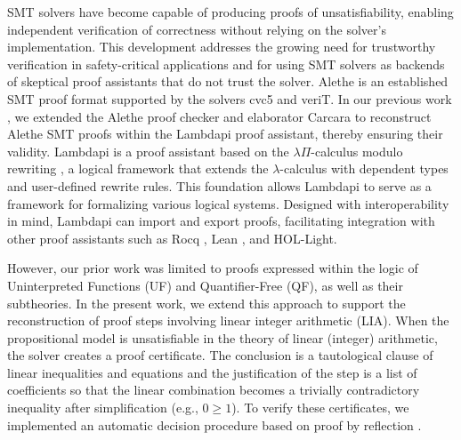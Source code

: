 \documentclass[runningheads]{llncs}
\begin{document}
SMT solvers have become capable of producing proofs of unsatisfiability,  enabling independent verification of correctness without relying on the solver's implementation.
This development addresses the growing need for trustworthy verification in safety-critical applications and for using SMT solvers as backends of skeptical proof assistants that do not trust the solver.
Alethe \cite{alethe,alethespec} is an established SMT proof format supported by the solvers cvc5 and veriT. In our previous work \cite{ColtellacciMD24}, we extended the Alethe proof checker and elaborator Carcara \cite{carcara} to
reconstruct Alethe SMT proofs within the Lambdapi proof assistant, thereby ensuring their validity.
Lambdapi \cite{lambdapi} is a proof assistant based on the $\lambda\Pi$-calculus modulo rewriting \cite{lpmodulo}, a logical framework \cite{lf} that extends the $\lambda$-calculus with dependent types and user-defined rewrite rules.
This foundation allows Lambdapi to serve as a framework for formalizing various logical systems.
Designed with interoperability in mind, Lambdapi can import and export proofs, facilitating integration with other proof assistants \cite{LPAR2024:Translating_HOL_Light_proofs} such as Rocq \cite{Rocq-refman}, Lean \cite{lean4:2021}, and HOL-Light. 

However, our prior work was limited to proofs expressed within the logic of Uninterpreted Functions (UF) and Quantifier-Free (QF), as well as their subtheories. 
In the present work, we extend this approach to support the reconstruction of proof steps involving linear integer arithmetic (LIA).
When the propositional model is unsatisfiable in the theory of linear (integer) arithmetic, the solver creates a proof certificate.
The conclusion is a tautological clause of linear inequalities and equations and the justification of the step is a list of coefficients so that the linear combination becomes a trivially contradictory inequality after simplification (e.g., $0 \geq 1$).
To verify these certificates, we implemented an automatic decision procedure based on proof by reflection \cite{reflection-origin-coq,ring-coq}.
\end{document}
